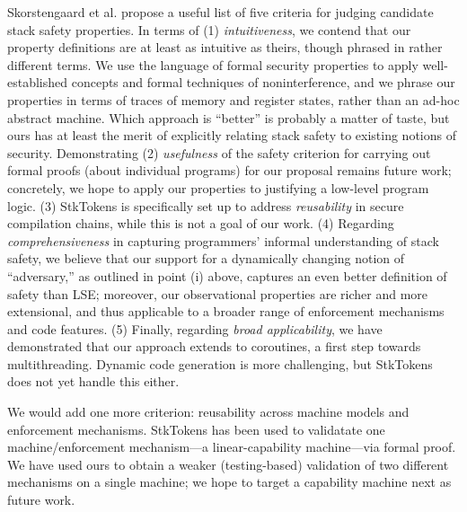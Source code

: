 \documentclass[10pt,conference]{ieeetran}%
\theoremstyle{definition}
\begin{document}
{Skorstengaard et al. \cite{SkorstengaardSTKJFP} propose a useful list of five criteria for judging
candidate stack safety properties.
%
In terms of (1) {\em intuitiveness}, we contend that our property
definitions are at least as
intuitive as theirs, though phrased in rather different terms.
We use the language of formal security
properties to apply well-established concepts \ifspace and formal techniques \fi
of noninterference, and we phrase our properties in terms of
traces of memory and register states, rather than an
ad-hoc abstract machine.
Which approach is ``better'' is probably a matter of taste, but ours
has \ifspace at least \fi the merit of explicitly relating stack safety to existing
notions of security.
%
Demonstrating (2) {\em usefulness} of the safety criterion
for carrying out formal proofs (about individual programs) for our proposal
remains future work; concretely, we
hope to apply our properties to justifying a low-level program logic.
%
(3) StkTokens is specifically set up to address {\em reusability} in secure
compilation chains, while this is not a goal of our work.
%
(4) Regarding {\em comprehensiveness} in capturing programmers' informal
understanding of stack safety, we believe that our support
for a dynamically changing notion of ``adversary,'' as outlined in point (i) above,
captures an even better definition of safety than LSE; moreover, our observational
properties are richer and more extensional, and thus
applicable to a broader range of enforcement mechanisms and code features.
%
(5) Finally, regarding {\em broad applicability}, we have demonstrated that
our approach extends to
coroutines, a first step towards multithreading. Dynamic code generation is
more challenging, but StkTokens does not yet handle this either.

We would add one more criterion: reusability across machine models and
enforcement mechanisms. StkTokens has been used to validatate
one machine/enforcement mechanism---a linear-capability machine---via formal
proof. We have used ours to obtain a weaker (testing-based) validation of
two different mechanisms on a single machine; we hope to target a capability machine
next as future work.

}
\end{document}
